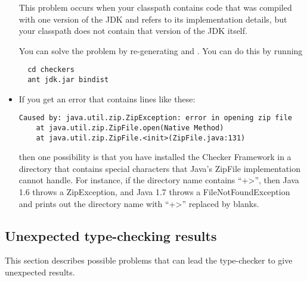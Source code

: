 \begin{itemize}
This problem occurs when your classpath contains code that was compiled
with one version of the JDK and refers to its implementation details, but
your classpath does not contain that version of the JDK itself.

You can solve the problem by re-generating  and
.  You can do this by running

\begin{Verbatim}
  cd checkers
  ant jdk.jar bindist
\end{Verbatim}

\item
If you get an error that contains lines like these:

\begin{Verbatim}
Caused by: java.util.zip.ZipException: error in opening zip file
	at java.util.zip.ZipFile.open(Native Method)
	at java.util.zip.ZipFile.<init>(ZipFile.java:131)
\end{Verbatim}

\noindent
then one possibility is that you have installed the Checker Framework in a
directory that contains special characters that Java's ZipFile
implementation cannot handle.  For instance, if the directory name contains
``\<+>'', then Java 1.6 throws a ZipException, and Java 1.7 throws a
FileNotFoundException and prints out the directory name with ``\<+>''
replaced by blanks.

\end{itemize}


\subsection{Unexpected type-checking results\label{common-problems-typechecking}}

This section describes possible problems that can lead the type-checker to
give unexpected results.


